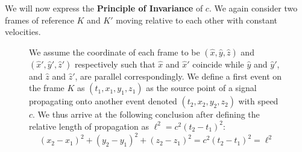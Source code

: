 \documentclass{article}
\begin{document}
			We will now express the \textbf{Principle of Invariance} of $c$. We again consider two frames of reference $K$ and $K'$ moving relative to each other with constant velocities.
			\begin{figure}[h]
				\begin{subfigure}{0.4\textwidth}
					\center
				\end{subfigure}
				\hfill
				\begin{minipage}{0.56\columnwidth}
					\begin{spacing}{1.5}
						We assume the coordinate of each frame to be $(\hat{x}, \hat{y}, \hat{z})$ and $(\hat{x}', \hat{y}', \hat{z}')$ respectively such that $\hat{x}$ and $\hat{x}'$ coincide while $\hat{y}$ and $\hat{y}'$, and $\hat{z}$ and $\hat{z}'$, are parallel correspondingly. We define a first event on the frame $K$ as $(t_1,x_1,y_1,z_1)$ as the source point of a signal propagating onto another event denoted $(t_2, x_2, y_2, z_2)$ with speed $c$. We thus arrive at the following conclusion after defining the relative length of propagation as $\ell^2 = c^2 (t_2 - t_1)^2$:
						$$ (x_2 - x_1)^2 + (y_2 - y_1)^2 + (z_2 - z_1)^2 = c^2 (t_2 - t_1)^2 = \ell^2$$
					\end{spacing}
				\end{minipage}
			\end{figure}
			\vspace{-1cm}
			
\end{document}

